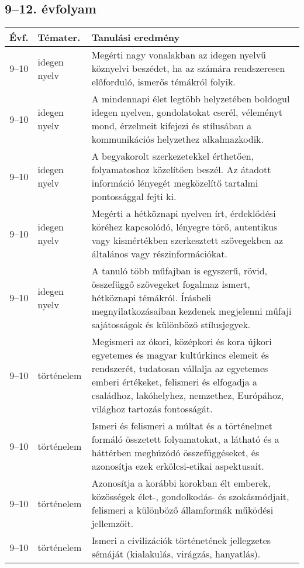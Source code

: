 \subsection{9--12. évfolyam}
\begin{small}
  \begin{longtable}{c | p{2cm} |  p{11cm} }
    \textbf{Évf.} & \textbf{Témater.} & \textbf{Tanulási eredmény} \\ \hline \hline
    \endhead

              9--10 & idegen nyelv & Megérti nagy vonalakban az idegen nyelvű köznyelvi beszédet, ha az számára rendszeresen előforduló, ismerős témákról folyik. \\ \hline
              9--10 & idegen nyelv & A mindennapi élet legtöbb helyzetében boldogul idegen nyelven, gondolatokat cserél, véleményt mond, érzelmeit kifejezi és stílusában a kommunikációs helyzethez alkalmazkodik. \\ \hline
              9--10 & idegen nyelv & A begyakorolt szerkezetekkel érthetően, folyamatoshoz közelítően beszél. Az átadott információ lényegét megközelítő tartalmi pontossággal fejti ki. \\ \hline
              9--10 & idegen nyelv & Megérti a hétköznapi nyelven írt, érdeklődési köréhez kapcsolódó, lényegre törő, autentikus vagy kismértékben szerkesztett szövegekben az általános vagy részinformációkat. \\ \hline
              9--10 & idegen nyelv & A tanuló több műfajban is egyszerű, rövid, összefüggő szövegeket fogalmaz ismert, hétköznapi témákról. Írásbeli megnyilatkozásaiban kezdenek megjelenni műfaji sajátosságok és különböző stílusjegyek. \\ \hline
              9--10 & történelem & Megismeri az ókori, középkori és kora újkori egyetemes és magyar kultúrkincs elemeit és rendszerét, tudatosan vállalja az egyetemes emberi értékeket, felismeri és elfogadja a családhoz, lakóhelyhez, nemzethez, Európához, világhoz tartozás fontosságát. \\ \hline
              9--10 & történelem & Ismeri és felismeri a múltat és a történelmet formáló összetett folyamatokat, a látható és a háttérben meghúzódó összefüggéseket, és azonosítja ezek erkölcsi-etikai aspektusait. \\ \hline
              9--10 & történelem & Azonosítja a korábbi korokban élt emberek, közösségek élet-, gondolkodás- és szokásmódjait, felismeri a különböző államformák működési jellemzőit. \\ \hline
              9--10 & történelem & Ismeri a civilizációk történetének jellegzetes sémáját (kialakulás, virágzás, hanyatlás). \\ \hline

\end{longtable}
\end{small}
